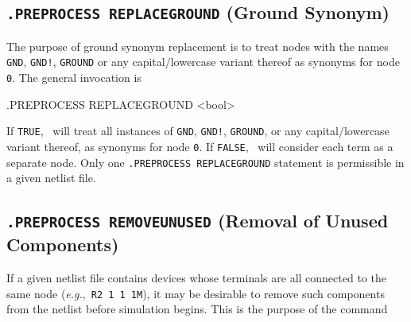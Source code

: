 

\newpage
\subsection{\texttt {.PREPROCESS REPLACEGROUND} (Ground Synonym)}

The purpose of ground synonym replacement is to treat nodes with the names
{\tt GND}, {\tt GND!}, {\tt GROUND} or any capital/lowercase variant thereof
as synonyms for node {\tt 0}.  The general invocation is

\begin{Command}

\format
.PREPROCESS REPLACEGROUND <bool>

\arguments

\begin{Arguments}


If {\tt TRUE}, \Xyce~will treat all instances of {\tt GND}, {\tt GND!}, {\tt GROUND},
or any capital/lowercase variant thereof, as synonyms for node {\tt 0}.  If
{\tt FALSE}, \Xyce~will consider each term as a separate node.  Only one
{\tt .PREPROCESS REPLACEGROUND} statement is permissible in a given netlist file.

\end{Arguments}
\end{Command}

\newpage
\subsection{\texttt {.PREPROCESS REMOVEUNUSED} (Removal of Unused Components)}
If a given netlist file contains devices whose terminals are all connected to
the same node (\emph{e.g.},~\texttt{R2~1~1~1M}), it may be desirable to remove such
components from the netlist before simulation begins.  This is the purpose of
the command

